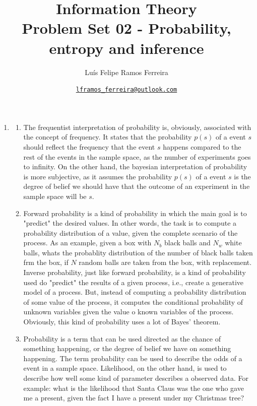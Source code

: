 \documentclass{article}
\title{Information Theory \\ \large Problem Set 02 - Probability, entropy and inference}
\author{Luís Felipe Ramos Ferreira}
\date{\href{mailto:lframos\_ferreira@outlook.com}{\texttt{lframos\_ferreira@outlook.com}}
}
\begin{document}
\maketitle

\begin{enumerate}
	\item \begin{enumerate}
		      \item The frequentist interpretation of probability is, obviously, associated with the concept of frequency. It states that the probability \(p(s)\) of a event \(s\) should reflect the frequency that the event \(s\) happens compared to the rest of the events in the sample space, as the number of experiments goes to infinity. On the other hand, the bayesian interpretation of probability is more subjective, as it assumes the probability \(p(s)\) of a event \(s\) is the degree of belief we should have that the outcome of an experiment in the sample space will be \(s\).
		      \item Forward probability is a kind of probability in which the main goal is to "predict" the desired values. In other words, the task is to compute a probability distribution of a value, given the complete scenario of the process. As an example, given a box with \(N_b\) black balls and \(N_w\) white balls, whats the probablity distribution of the number of black balls taken frm the box, if \(N\) random balls are taken from the box, with replacement.
		            Inverse probability, just like forward probability, is a kind of probability used do "predict" the results of a given process, i.e., create a generative model of a process. But, instead of computing a probability distribution of some value of the process, it computes the conditional probability of unknown variables given the value o known variables of the process. Obviously, this kind of probability uses a lot of Bayes' theorem.
		      \item Probability is a term that can be used directed as the chance of something happening, or the degree of belief we have on something happening. The term probability can be used to describe the odds of a event in a sample space. Likelihood, on the other hand, is used to describe how well some kind of parameter describes a observed data. For example: what is the likelihood that Santa Claus was the one who gave me a present, given the fact I have a present under my Christmas tree?
	      \end{enumerate}


\end{enumerate}
\end{document}
